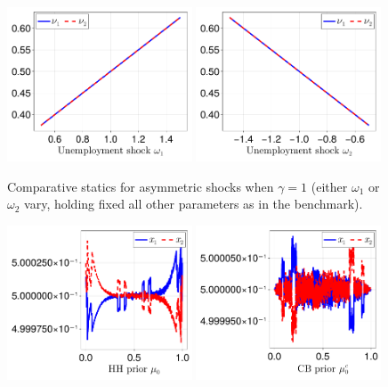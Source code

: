 \documentclass[12pt,a4paper]{article}
\begin{document}
\begin{figure}[H]
\centering
\includegraphics[width=0.49\textwidth]{figures/V9/γ_1/fig_optimal_ν_ω_1.pdf}
\includegraphics[width=0.49\textwidth]{figures/V9/γ_1/fig_optimal_ν_ω_2.pdf}
\caption{Comparative statics for asymmetric shocks when $\gamma=1$ (either $\omega_1$ or $\omega_2$ vary, holding fixed all other parameters as in the benchmark).}
\label{FigureA34}
\end{figure}

\begin{figure}[H]
\centering
\includegraphics[width=0.49\textwidth]{figures/V9/γ_1/fig_optimal_x_μ_0.pdf}
\includegraphics[width=0.49\textwidth]{figures/V9/γ_1/fig_optimal_x_μ_0_c.pdf}
\end{figure}
\end{document}
